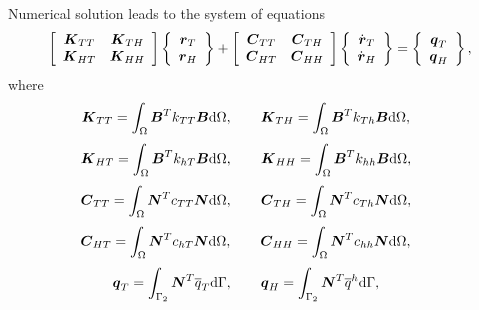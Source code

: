 \documentclass[a4paper]{article}
\newcommand{\tenss}[1]{\mbox{\boldmath$#1$}} %
\begin{document}
\noindent Numerical solution leads to the system of equations
\begin{eqnarray}\label{final_eq}
\left[ \begin{array}{cc}
\tenss{K}_{TT} & \tenss{K}_{TH} \\
\tenss{K}_{HT} & \tenss{K}_{HH}
\end{array} \right]
\left\{ \begin{array}{c}
\tenss{r}_T \\
\tenss{r}_H
\end{array} \right\} + 
\left[ \begin{array}{cc}
\tenss{C}_{TT} & \tenss{C}_{TH} \\
\tenss{C}_{HT} & \tenss{C}_{HH}
\end{array} \right]
\left\{ \begin{array}{c}
\dot{\tenss{r}}_T \\
\dot{\tenss{r}}_H
\end{array} \right\} = 
\left\{ \begin{array}{c}
\tenss{q}_{T} \\
\tenss{q}_{H}
\end{array} \right\},
\end{eqnarray}
where
\begin{eqnarray}
\tenss{K}_{TT} = \int_{\Omega} \tenss{B}^T k_{TT} \tenss{B}{\rm d}\Omega,\qquad
\tenss{K}_{TH} = \int_{\Omega} \tenss{B}^T k_{Th} \tenss{B}{\rm d}\Omega,\qquad
\end{eqnarray}
\begin{eqnarray}
\tenss{K}_{HT} = \int_{\Omega} \tenss{B}^T k_{hT} \tenss{B}{\rm d}\Omega,\qquad
\tenss{K}_{HH} = \int_{\Omega} \tenss{B}^T k_{hh} \tenss{B}{\rm d}\Omega,\qquad
\end{eqnarray}
\begin{eqnarray}
\tenss{C}_{TT} = \int_{\Omega} \tenss{N}^T c_{TT}  \tenss{N} {\rm d}\Omega,\qquad
\tenss{C}_{TH} = \int_{\Omega} \tenss{N}^T c_{Th}  \tenss{N} {\rm d}\Omega,\qquad
\end{eqnarray}
\begin{eqnarray}
\tenss{C}_{HT} = \int_{\Omega} \tenss{N}^T c_{hT}  \tenss{N} {\rm d}\Omega,\qquad
\tenss{C}_{HH} = \int_{\Omega} \tenss{N}^T c_{hh}  \tenss{N} {\rm d}\Omega,\qquad
\end{eqnarray}
\begin{eqnarray}
\tenss{q}_T = \int_{\Gamma_2} \tenss{N}^T  \overline{q}_{T}{\rm d}\Gamma,\qquad
\tenss{q}_H = \int_{\Gamma_2} \tenss{N}^T  \overline{q}^{h}{\rm d}\Gamma,\qquad
\end{eqnarray}
\end{document}
